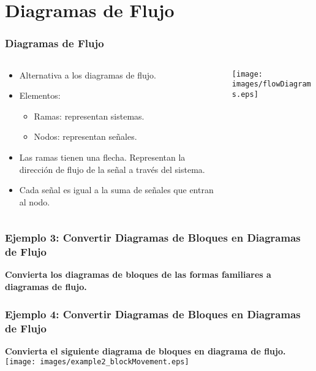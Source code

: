 \documentclass[aspectratio=169,handout]{beamer}
\theoremstyle{definition}
\theoremstyle{plain}
\theoremstyle{remark}
\begin{document}
\section{Diagramas de Flujo}
\begin{frame}[<+->]\frametitle{Diagramas de Flujo}
\begin{columns}
\begin{column}{0.5\textwidth}
\begin{itemize}
	\item Alternativa a los diagramas de flujo.
	\item Elementos:
	\begin{itemize}
		\item Ramas: representan sistemas.
		\item Nodos: representan señales.
	\end{itemize}
	\item Las ramas tienen una flecha. Representan la dirección de flujo de la señal a través del sistema.
	\item Cada señal es igual a la suma de señales que entran al nodo.
\end{itemize}
\end{column}	
\begin{column}{0.5\textwidth}
\centering
\vspace*{5mm}
\texttt{[image: images/flowDiagrams.eps]}	
\end{column}	
\end{columns}
\end{frame}

\begin{frame}[<+->]\frametitle{Ejemplo 3: Convertir Diagramas de Bloques en Diagramas de Flujo}
\textbf{Convierta los diagramas de bloques de las formas familiares a diagramas de flujo.}\\
\end{frame}

\begin{frame}[<+->]\frametitle{Ejemplo 4: Convertir Diagramas de Bloques en Diagramas de Flujo}
\textbf{Convierta el siguiente diagrama de bloques en diagrama de flujo.}\\
\centering
\vspace*{5mm}
\texttt{[image: images/example2\_blockMovement.eps]}	
\end{frame}
\end{document}
